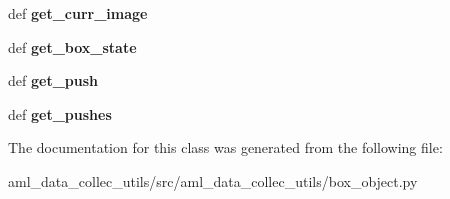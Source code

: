 \begin{DoxyCompactItemize}
\item 
\hypertarget{classaml__data__collec__utils_1_1box__object_1_1_box_object_a7d9d988a7607d7ff4b7048542a0c37b3}{def {\bfseries get\-\_\-curr\-\_\-image}}\label{classaml__data__collec__utils_1_1box__object_1_1_box_object_a7d9d988a7607d7ff4b7048542a0c37b3}

\item 
\hypertarget{classaml__data__collec__utils_1_1box__object_1_1_box_object_a7483c6c349ad6fdee4ef76c01bb0cea6}{def {\bfseries get\-\_\-box\-\_\-state}}\label{classaml__data__collec__utils_1_1box__object_1_1_box_object_a7483c6c349ad6fdee4ef76c01bb0cea6}

\item 
\hypertarget{classaml__data__collec__utils_1_1box__object_1_1_box_object_a88af2c9d0a9501750921c75ccc613b55}{def {\bfseries get\-\_\-push}}\label{classaml__data__collec__utils_1_1box__object_1_1_box_object_a88af2c9d0a9501750921c75ccc613b55}

\item 
\hypertarget{classaml__data__collec__utils_1_1box__object_1_1_box_object_aa3824a2b91c66708d28b51d3bdc4e409}{def {\bfseries get\-\_\-pushes}}\label{classaml__data__collec__utils_1_1box__object_1_1_box_object_aa3824a2b91c66708d28b51d3bdc4e409}

\end{DoxyCompactItemize}


The documentation for this class was generated from the following file\-:\begin{DoxyCompactItemize}
\item 
aml\-\_\-data\-\_\-collec\-\_\-utils/src/aml\-\_\-data\-\_\-collec\-\_\-utils/box\-\_\-object.\-py\end{DoxyCompactItemize}
